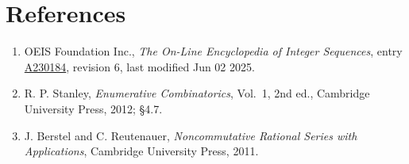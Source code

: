 \documentclass[11pt]{article}
\theoremstyle{definition}
\begin{document}
\section{References}

\begin{enumerate}

\item OEIS Foundation Inc., \emph{The On-Line Encyclopedia of Integer Sequences}, entry \href{https://oeis.org/A230184}{A230184}, revision 6, last modified Jun 02 2025.

\item R. P. Stanley, \emph{Enumerative Combinatorics}, Vol.~1, 2nd ed., Cambridge University Press, 2012; \S4.7.

\item J. Berstel and C. Reutenauer, \emph{Noncommutative Rational Series with Applications}, Cambridge University Press, 2011.

\end{enumerate}
\end{document}
